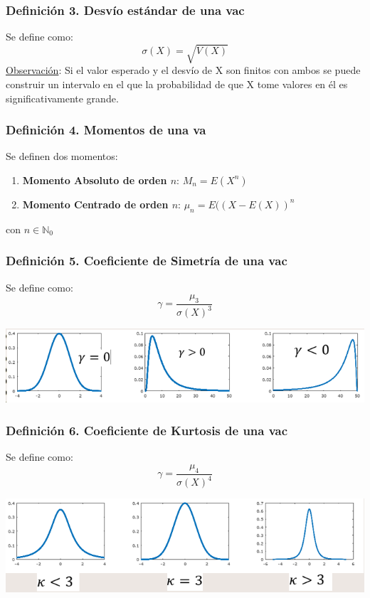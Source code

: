 \documentclass{article}
\newcommand{\naturales}{\mathbb{N}}                     %
\begin{document}
\subsubsection*{Definición 3. Desvío estándar de una vac}
Se define como:
\begin{equation*}
    \sigma(X) = \sqrt{V(X)}
\end{equation*}
\underline{Observación}: Si el valor esperado y el desvío de X son finitos con ambos se puede construir un intervalo  en el que la probabilidad de que X tome valores en él es significativamente grande.

\subsubsection*{Definición 4. Momentos de una va}
Se definen dos momentos:
\begin{enumerate}
    \item \textbf{Momento Absoluto de orden $n$}: $M_n = E(X^n)$
    \item \textbf{Momento Centrado de orden $n$}: $\mu_n = E((X - E(X))^n$
\end{enumerate}
con $n \in \naturales_0$

\subsubsection*{Definición 5. Coeficiente de Simetría de una vac}
Se define como:
\begin{equation*}
    \gamma = \frac{\mu_3}{\sigma(X)^3}
\end{equation*}
    \begin{center}
        \includegraphics[width=.60\textwidth]{Images/CoefSimetriaVAC.png}
    \end{center} 

\subsubsection*{Definición 6. Coeficiente de Kurtosis de una vac}
Se define como:
\begin{equation*}
    \gamma = \frac{\mu_4}{\sigma(X)^4}
\end{equation*}
\begin{center}
        \includegraphics[width=.60\textwidth]{Images/CoefKurtosisVAC.png}
    \end{center} 
\end{document}
